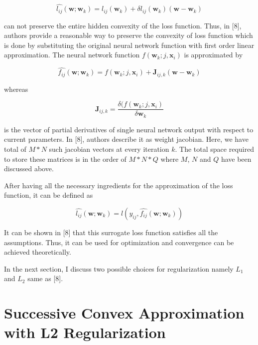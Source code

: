 \begin{equation}
\hat{l_{ij}} (\textbf{w};\textbf{w}_k) = l_{ij}(\textbf{w}_k) + \delta l_{ij} (\textbf{w}_k) (\textbf{w}-\textbf{w}_k)
\end{equation}

can not preserve the entire hidden convexity of the loss function. Thus, in [8], authors provide a reasonable way to preserve the convexity of loss function which is done by substituting the original neural network function with first order linear approximation. The neural network function 
$f(\textbf{w}_k;j,\textbf{x}_{i})$ is approximated by

\begin{equation}
\hat{f_{ij}}(\textbf{w};\textbf{w}_k)=f(\textbf{w}_k;j,\textbf{x}_{i})+\textbf{J}_{ij,k}(\textbf{w}-\textbf{w}_k) 
\end{equation}

whereas 

\begin{equation}
\textbf{J}_{ij,k} = \frac{\delta (f(\textbf{w}_k;j,\textbf{x}_i)}{\delta \textbf{w}_k} 
\end{equation}

is the vector of partial derivatives of single neural network output with respect to current parameters. In [8], authors describe it as weight jacobian. Here, we have total of $M*N$ such jacobian vectors at every iteration $k$. The total space required to store these matrices is in the order of $M*N*Q$ where 
$M$, $N$ and $Q$ have been discussed above.

After having all the necessary ingredients for the approximation of the loss function, it can be defined as

\begin{equation}
\hat{l_{ij}} (\textbf{w};\textbf{w}_k) = l(y_{ij},\hat{f_{ij}} (\textbf{w};\textbf{w}_k) )
\end{equation}

It can be shown in [8] that this surrogate loss function satisfies all the assumptions. Thus, it can be used for optimization and convergence can be achieved theoretically.

In the next section, I discuss two possible choices for regularization namely $L_1$ and $L_2$ same as [8].  

\section {Successive Convex Approximation with L2 Regularization}

